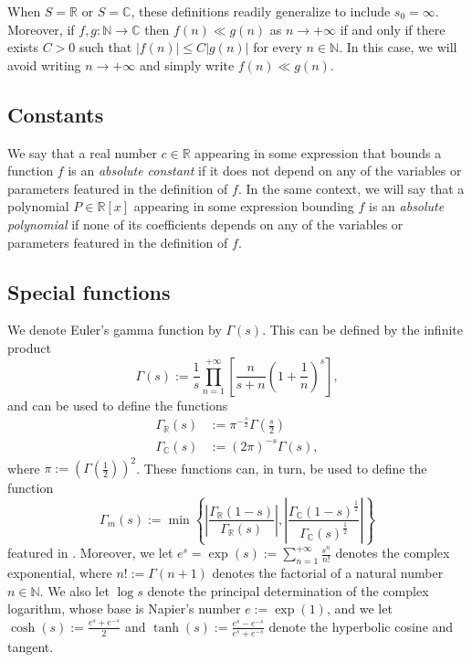 \documentclass[10pt,a4paper]{amsart}
\theoremstyle{plain}
\theoremstyle{definition}
\theoremstyle{remark}
\newcommand{\R}{\mathbb{R}}
\newcommand{\C}{\mathbb{C}}
\begin{document}
When $S = \mathbb{R}$ or $S = \mathbb{C}$, these definitions readily generalize to include $s_0 = \infty$. Moreover, if $f,g \colon \mathbb{N} \to \mathbb{C}$ then $f(n) \ll g(n)$ as $n \to +\infty$ if and only if there exists $C > 0$ such that $\lvert f(n) \rvert \leq C \lvert g(n) \rvert$ for every $n \in \mathbb{N}$. In this case, we will avoid writing $n \to +\infty$ and simply write $f(n) \ll g(n)$.

\subsection{Constants}

We say that a real number $c \in \mathbb{R}$ appearing in some expression that bounds a function $f$ is an \textit{absolute constant} if it does not depend on any of the variables or parameters featured in the definition of $f$. In the same context, we will say that a polynomial $P \in \mathbb{R}[x]$ appearing in some expression bounding $f$ is an \textit{absolute polynomial} if none of its coefficients depends on any of the variables or parameters featured in the definition of $f$.

\subsection{Special functions}
We denote Euler's gamma function by $\Gamma(s)$. This can be defined by the infinite product 
\[
\Gamma(s) := \frac{1}{s} \prod_{n=1}^{+\infty} \left[ \frac{n}{s+n} \left( 1 + \frac{1}{n} \right)^s \right], \] and can be used to define the functions
\[
\begin{aligned}
\Gamma_{\mathbb{R}}(s) &:= \pi^{-\frac{s}{2}} \Gamma\left(\frac{s}{2}\right) \\
\Gamma_{\mathbb{C}}(s) &:= (2\pi)^{-s} \Gamma(s),
\end{aligned}
\]
where $\pi := \left(\Gamma\left(\frac{1}{2}\right)\right)^2$. These functions can, in turn, be used to define the function
\begin{equation} \label{eq:Gamma_m}
    \Gamma_{m}(s) :=
    \min\left\{
    \left|\frac{\Gamma_\R(1 - s)}{\Gamma_\R(s)} \right|,\left|\frac{\Gamma_\C(1 - s)^
{\frac{1}{2}}}{\Gamma_\C(s)^{\frac{1}{2}}}\right|\right\}
\end{equation}
featured in \cite{GeLa24}.
Moreover, we let $e^s = \exp(s) := \sum_{n=1}^{+\infty} \frac{s^n}{n!}$ denotes the complex exponential, where $n! := \Gamma(n+1)$ denotes the factorial of a natural number $n \in \mathbb{N}$. We also let $\log s$ denote the principal determination of the complex logarithm, whose base is Napier's number $e := \exp(1)$, and we let $\cosh(s) := \frac{e^s+e^{-s}}{2}$ and $\tanh(s) := \frac{e^s-e^{-s}}{e^s+e^{-s}}$ denote the hyperbolic cosine and tangent.
\end{document}
